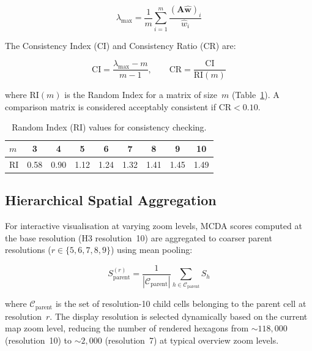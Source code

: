 \begin{equation}
\lambda_{\max} = \frac{1}{m} \sum_{i=1}^{m} \frac{(\mathbf{A} \hat{\mathbf{w}})_i}{\hat{w}_i}
\end{equation}

\noindent The Consistency Index (CI) and Consistency Ratio (CR) are:

\begin{equation}
\text{CI} = \frac{\lambda_{\max} - m}{m - 1}, \qquad
\text{CR} = \frac{\text{CI}}{\text{RI}(m)}
\end{equation}

\noindent where $\text{RI}(m)$ is the Random Index for a matrix of size~$m$ (Table~\ref{tab:ri}). A comparison matrix is considered acceptably consistent if $\text{CR} < 0.10$.

\begin{table}[htbp]
\centering
\caption{Random Index (RI) values for consistency checking.}
\label{tab:ri}
\small
\begin{tabular}{lcccccccc}
\toprule
$m$ & 3 & 4 & 5 & 6 & 7 & 8 & 9 & 10 \\
\midrule
RI & 0.58 & 0.90 & 1.12 & 1.24 & 1.32 & 1.41 & 1.45 & 1.49 \\
\bottomrule
\end{tabular}
\end{table}

\subsection{Hierarchical Spatial Aggregation}
\label{sec:aggregation}

For interactive visualisation at varying zoom levels, MCDA scores computed at the base resolution (H3 resolution~10) are aggregated to coarser parent resolutions ($r \in \{5, 6, 7, 8, 9\}$) using mean pooling:

\begin{equation}
S_{\text{parent}}^{(r)} = \frac{1}{|\mathcal{C}_{\text{parent}}|} \sum_{h \in \mathcal{C}_{\text{parent}}} S_h
\end{equation}

\noindent where $\mathcal{C}_{\text{parent}}$ is the set of resolution-10 child cells belonging to the parent cell at resolution~$r$. The display resolution is selected dynamically based on the current map zoom level, reducing the number of rendered hexagons from $\sim\!118{,}000$ (resolution~10) to $\sim\!2{,}000$ (resolution~7) at typical overview zoom levels.


